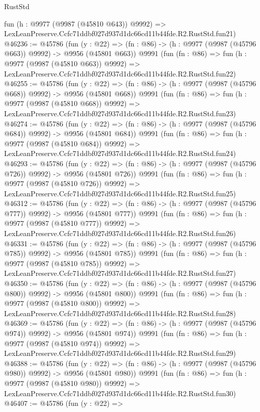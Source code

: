 \begin{lexlean}{RustStd}
\begin{coremodule}
    fun (h : @9977 (@9987 (@45810 @643)) @9992) =>
    LexLeanPreserve.Ccfc71ddbf027d937d1dc66cd11b44fde.R2.RustStd.fun21)
@46236 := @45786
    (fun (y : @22) => (fn : @86) -> (h : @9977 (@9987 (@45796 @663)) @9992) -> @9956 (@45801 @663))
    @9991
    (fun (fn : @86) =>
    fun (h : @9977 (@9987 (@45810 @663)) @9992) =>
    LexLeanPreserve.Ccfc71ddbf027d937d1dc66cd11b44fde.R2.RustStd.fun22)
@46255 := @45786
    (fun (y : @22) => (fn : @86) -> (h : @9977 (@9987 (@45796 @668)) @9992) -> @9956 (@45801 @668))
    @9991
    (fun (fn : @86) =>
    fun (h : @9977 (@9987 (@45810 @668)) @9992) =>
    LexLeanPreserve.Ccfc71ddbf027d937d1dc66cd11b44fde.R2.RustStd.fun23)
@46274 := @45786
    (fun (y : @22) => (fn : @86) -> (h : @9977 (@9987 (@45796 @684)) @9992) -> @9956 (@45801 @684))
    @9991
    (fun (fn : @86) =>
    fun (h : @9977 (@9987 (@45810 @684)) @9992) =>
    LexLeanPreserve.Ccfc71ddbf027d937d1dc66cd11b44fde.R2.RustStd.fun24)
@46293 := @45786
    (fun (y : @22) => (fn : @86) -> (h : @9977 (@9987 (@45796 @726)) @9992) -> @9956 (@45801 @726))
    @9991
    (fun (fn : @86) =>
    fun (h : @9977 (@9987 (@45810 @726)) @9992) =>
    LexLeanPreserve.Ccfc71ddbf027d937d1dc66cd11b44fde.R2.RustStd.fun25)
@46312 := @45786
    (fun (y : @22) => (fn : @86) -> (h : @9977 (@9987 (@45796 @777)) @9992) -> @9956 (@45801 @777))
    @9991
    (fun (fn : @86) =>
    fun (h : @9977 (@9987 (@45810 @777)) @9992) =>
    LexLeanPreserve.Ccfc71ddbf027d937d1dc66cd11b44fde.R2.RustStd.fun26)
@46331 := @45786
    (fun (y : @22) => (fn : @86) -> (h : @9977 (@9987 (@45796 @785)) @9992) -> @9956 (@45801 @785))
    @9991
    (fun (fn : @86) =>
    fun (h : @9977 (@9987 (@45810 @785)) @9992) =>
    LexLeanPreserve.Ccfc71ddbf027d937d1dc66cd11b44fde.R2.RustStd.fun27)
@46350 := @45786
    (fun (y : @22) => (fn : @86) -> (h : @9977 (@9987 (@45796 @800)) @9992) -> @9956 (@45801 @800))
    @9991
    (fun (fn : @86) =>
    fun (h : @9977 (@9987 (@45810 @800)) @9992) =>
    LexLeanPreserve.Ccfc71ddbf027d937d1dc66cd11b44fde.R2.RustStd.fun28)
@46369 := @45786
    (fun (y : @22) => (fn : @86) -> (h : @9977 (@9987 (@45796 @974)) @9992) -> @9956 (@45801 @974))
    @9991
    (fun (fn : @86) =>
    fun (h : @9977 (@9987 (@45810 @974)) @9992) =>
    LexLeanPreserve.Ccfc71ddbf027d937d1dc66cd11b44fde.R2.RustStd.fun29)
@46388 := @45786
    (fun (y : @22) => (fn : @86) -> (h : @9977 (@9987 (@45796 @980)) @9992) -> @9956 (@45801 @980))
    @9991
    (fun (fn : @86) =>
    fun (h : @9977 (@9987 (@45810 @980)) @9992) =>
    LexLeanPreserve.Ccfc71ddbf027d937d1dc66cd11b44fde.R2.RustStd.fun30)
@46407 := @45786
    (fun (y : @22) =>

\end{coremodule}
\end{lexlean}
